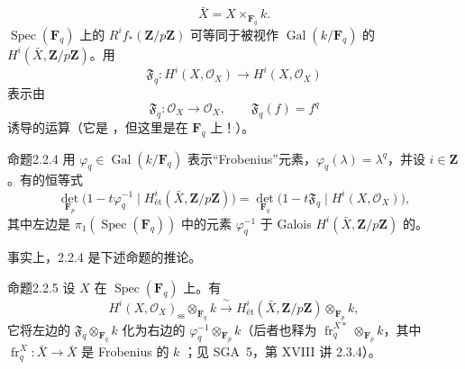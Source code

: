 \[
\bar X=X\times_{\mathbf F_q}k. \tag{2.2.1}
\]
$\operatorname{Spec}(\mathbf F_q)$ 上的 $R^if_*(\mathbf Z/p\mathbf Z)$ 可等同于被视作 $\operatorname{Gal}(k/\mathbf F_q)$ 的 $H^i(\bar X,\mathbf Z/p\mathbf Z)$。用
\[
\mathfrak F_q:H^i(X,\mathcal O_X)\longrightarrow H^i(X,\mathcal O_X) \tag{2.2.2}
\]
表示由
\[
\mathfrak F_q:\mathcal O_X\longrightarrow\mathcal O_X,
\qquad\mathfrak F_q(f)=f^q \tag{2.2.3}
\]
诱导的运算（它是 ，但这里是在 $\mathbf F_q$ 上！）。
\begin{SGAresult}{命题}{2.2.4}
用 $\varphi_q\in\operatorname{Gal}(k/\mathbf F_q)$ 表示“Frobenius”元素，$\varphi_q(\lambda)=\lambda^q$，并设 $i\in\mathbf Z$。有的恒等式
\[
\det_{\mathbf F_p}\bigl(1-t\varphi_q^{-1}\mid
H^i_{\text{ét}}(\bar X,\mathbf Z/p\mathbf Z)\bigr)
=\det_{\mathbf F_q}\bigl(1-t\mathfrak F_q\mid H^i(X,\mathcal O_X)\bigr), \tag{2.2.4.1}
\]
其中左边是 $\pi_1(\operatorname{Spec}(\mathbf F_q))$ 中的元素 $\varphi_q^{-1}$ 于 Galois  $H^i(\bar X,\mathbf Z/p\mathbf Z)$ 的。
\end{SGAresult}
事实上，2.2.4 是下述命题的推论。
\begin{SGAresult}{命题}{2.2.5}
设 $X$ 在 $\operatorname{Spec}(\mathbf F_q)$ 上。有
\[
H^i(X,\mathcal O_X)_{\mathrm{ss}}\otimes_{\mathbf F_q}k
\xrightarrow{\ \sim\ }
H^i_{\text{ét}}(\bar X,\mathbf Z/p\mathbf Z)\otimes_{\mathbf F_p}k, \tag{2.2.6}
\]
它将左边的 $\mathfrak F_q\otimes_{\mathbf F_q}k$ 化为右边的 $\varphi_q^{-1}\otimes_{\mathbf F_p}k$（后者也释为 $\operatorname{fr}_q^{X*}\otimes_{\mathbf F_p}k$，其中 $\operatorname{fr}_q^X:\bar X\longrightarrow\bar X$ 是 Frobenius 的 $k$ ；见 SGA~5，第 XVIII 讲 2.3.4）。
\end{SGAresult}
